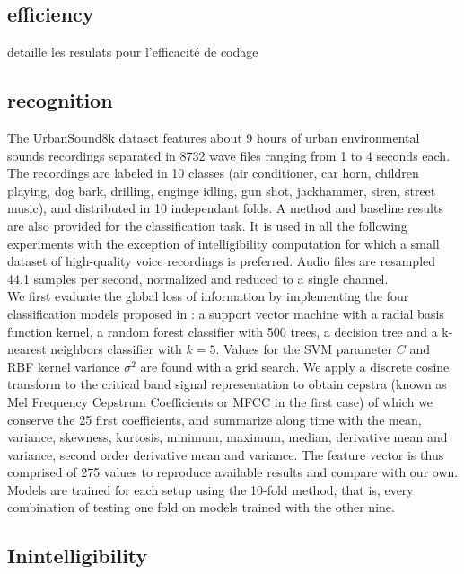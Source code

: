 \documentclass[final,3p,times,twocolumn]{elsarticle}
\begin{document}
\subsection{efficiency}

detaille les resulats pour l'efficacité de codage


\subsection{recognition}


The UrbanSound8k dataset\cite{salamon2014} features about 9 hours of urban environmental sounds recordings separated in 8732 wave files ranging from 1 to 4 seconds each. The recordings are labeled in 10 classes (air conditioner, car horn, children playing, dog bark, drilling, enginge idling, gun shot, jackhammer, siren, street music), and distributed in 10 independant folds. A method and baseline results are also provided for the classification task. It is used in all the following experiments with the exception of intelligibility computation for which a small dataset of high-quality voice recordings is preferred. Audio files are resampled 44.1 samples per second, normalized and reduced to a single channel.\\

We first evaluate the global loss of information by implementing the four classification models proposed in \cite{salamon2014}: a support vector machine with a radial basis function kernel, a random forest classifier with 500 trees, a decision tree and a k-nearest neighbors classifier with $k = 5$. Values for the SVM parameter $C$ and RBF kernel variance $\sigma^2$ are found with a grid search. We apply a discrete cosine transform to the critical band signal representation to obtain cepstra (known as Mel Frequency Cepstrum Coefficients or MFCC in the first case) of which we conserve the 25 first coefficients, and summarize along time with the mean, variance, skewness, kurtosis, minimum, maximum, median, derivative mean and variance, second order derivative mean and variance. The feature vector is thus comprised of 275 values to reproduce available results and compare with our own. Models are trained for each setup using the 10-fold method, that is, every combination of testing one fold on models trained with the other nine.\\

\subsection{Inintelligibility}
\end{document}

